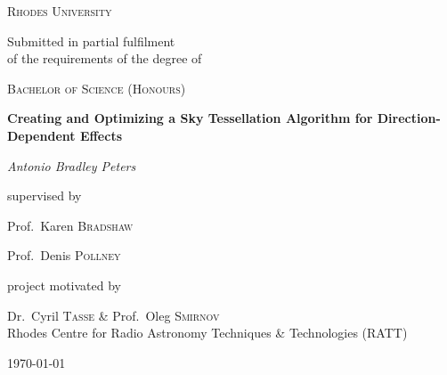 \begin{titlepage}
  \centering
  {\scshape\LARGE Rhodes University \par}
  \vspace{1cm}
  {\Large Submitted in partial fulfilment\\of the requirements of the degree of \par}
  \vspace{0.5cm}
  {\scshape\Large Bachelor of Science (Honours)\par}
  \vspace{1.5cm}
  {\huge\bfseries Creating and Optimizing a Sky Tessellation Algorithm for Direction-Dependent Effects\par}
  \vspace{2cm}
  {\Large\itshape Antonio Bradley Peters\par}
  \vfill
  supervised by\par
  Prof.~Karen \textsc{Bradshaw}\par
  Prof.~Denis \textsc{Pollney}\par
  \vspace{1cm}
  project motivated by\par
  Dr.~Cyril \textsc{Tasse} \& Prof.~Oleg \textsc{Smirnov}\\
  Rhodes Centre for Radio Astronomy Techniques \& Technologies (RATT)
  \vfill
  {\large \today\par}
\end{titlepage}